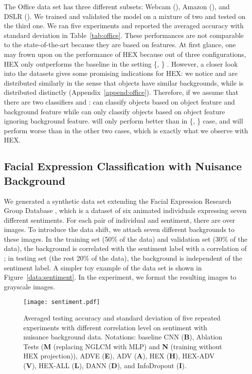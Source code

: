 The Office data set has three different subsets: 
Webcam (), Amazon (), and DSLR (). 
We trained and validated the model on a mixture 
of two and tested on the third one. 
We ran five experiments and reported the averaged accuracy 
with standard deviation in Table~\ref{tab:office}. 
These performances are not comparable to the state-of-the-art 
because they are based on features. 
At first glance, one may frown upon on the performance of HEX 
because out of three configurations, 
HEX only outperforms the baseline in the setting \{, \}  . 
However, a closer look into the datasets gives some promising indications for HEX: 
we notice  and  are distributed similarly 
in the sense that objects have similar backgrounds, 
while  is distributed distinctly (Appendix~\ref{append:office}). 
Therefore, if we assume that there are two classifiers  and :  
can classify objects based on object feature 
and background feature while  can only classify objects 
based on object feature ignoring background feature. 
 will only perform better than  in \{, \}   case, 
and will perform worse than  in the other two cases, 
which is exactly what we observe with HEX.

\subsection{Facial Expression Classification with Nuisance Background}
We generated a synthetic data set extending the Facial Expression Research Group Database \citep{aneja2016modeling}, 
which is a dataset of six animated individuals 
expressing seven different sentiments. 
For each pair of individual and sentiment, 
there are over  images. 
To introduce the data shift, 
we attach seven different backgrounds to these images. 
In the training set (50\% of the data) 
and validation set (30\% of the data), 
the background is correlated with the sentiment label 
with a correlation of ; 
in testing set (the rest 20\% of the data), 
the background is independent of the sentiment label. 
A simpler toy example of the data set is shown in Figure~\ref{data:sentiment}. 
In the experiment, we format the resulting images to  grayscale images. 



\begin{figure}
    \centering
    \texttt{[image: sentiment.pdf]}
    \caption{Averaged testing accuracy and standard deviation of five repeated experiments with different correlation level on sentiment with nuisance background data. Notations: baseline CNN (\textbf{B}), Ablation Tests (\textbf{M} (replacing NGLCM with MLP) and \textbf{N} (training without HEX projection)), ADVE (\textbf{E}), ADV (\textbf{A}), HEX (\textbf{H}), HEX-ADV (\textbf{V}), HEX-ALL (\textbf{L}), DANN (\textbf{D}), and InfoDropout (\textbf{I}).}
    \label{fig:sentiment}
\end{figure}

